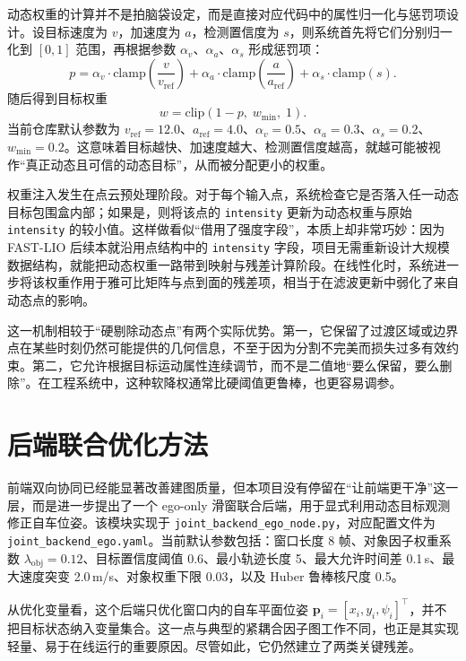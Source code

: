 \documentclass[UTF8,a4paper,12pt]{ctexart}
\begin{document}
动态权重的计算并不是拍脑袋设定，而是直接对应代码中的属性归一化与惩罚项设计。设目标速度为 \(v\)，加速度为 \(a\)，检测置信度为 \(s\)，则系统首先将它们分别归一化到 \([0,1]\) 范围，再根据参数 \(\alpha_v\)、\(\alpha_a\)、\(\alpha_s\) 形成惩罚项：
\begin{equation}
p = \alpha_v \cdot \mathrm{clamp}\left(\frac{v}{v_{\mathrm{ref}}}\right)
+ \alpha_a \cdot \mathrm{clamp}\left(\frac{a}{a_{\mathrm{ref}}}\right)
+ \alpha_s \cdot \mathrm{clamp}(s).
\end{equation}
随后得到目标权重
\begin{equation}
w = \mathrm{clip}(1-p,\; w_{\min},\; 1).
\end{equation}
当前仓库默认参数为 \(v_{\mathrm{ref}}=12.0\)、\(a_{\mathrm{ref}}=4.0\)、\(\alpha_v=0.5\)、\(\alpha_a=0.3\)、\(\alpha_s=0.2\)、\(w_{\min}=0.2\)。这意味着目标越快、加速度越大、检测置信度越高，就越可能被视作“真正动态且可信的动态目标”，从而被分配更小的权重。

权重注入发生在点云预处理阶段。对于每个输入点，系统检查它是否落入任一动态目标包围盒内部；如果是，则将该点的 \texttt{intensity} 更新为动态权重与原始 \texttt{intensity} 的较小值。这样做看似“借用了强度字段”，本质上却非常巧妙：因为 FAST-LIO 后续本就沿用点结构中的 \texttt{intensity} 字段，项目无需重新设计大规模数据结构，就能把动态权重一路带到映射与残差计算阶段。在线性化时，系统进一步将该权重作用于雅可比矩阵与点到面的残差项，相当于在滤波更新中弱化了来自动态点的影响。

这一机制相较于“硬剔除动态点”有两个实际优势。第一，它保留了过渡区域或边界点在某些时刻仍然可能提供的几何信息，不至于因为分割不完美而损失过多有效约束。第二，它允许根据目标运动属性连续调节，而不是二值地“要么保留，要么删除”。在工程系统中，这种软降权通常比硬阈值更鲁棒，也更容易调参。

\section{后端联合优化方法}
前端双向协同已经能显著改善建图质量，但本项目没有停留在“让前端更干净”这一层，而是进一步提出了一个 ego-only 滑窗联合后端，用于显式利用动态目标观测修正自车位姿。该模块实现于 \texttt{joint\_backend\_ego\_node.py}，对应配置文件为 \texttt{joint\_backend\_ego.yaml}。当前默认参数包括：窗口长度 8 帧、对象因子权重系数 \(\lambda_{\mathrm{obj}}=0.12\)、目标置信度阈值 0.6、最小轨迹长度 5、最大允许时间差 0.1\,s、最大速度突变 2.0\,m/s、对象权重下限 0.03，以及 Huber 鲁棒核尺度 0.5。

从优化变量看，这个后端只优化窗口内的自车平面位姿 \(\mathbf{p}_i=[x_i,y_i,\psi_i]^\top\)，并不把目标状态纳入变量集合。这一点与典型的紧耦合因子图工作不同，也正是其实现轻量、易于在线运行的重要原因。尽管如此，它仍然建立了两类关键残差。
\end{document}
